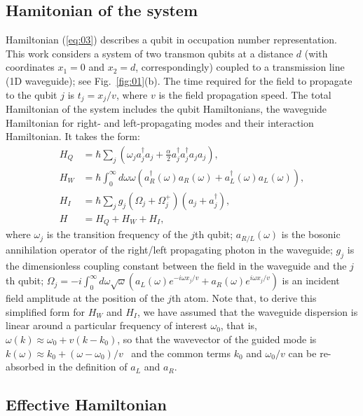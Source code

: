 \documentclass[lettersize,journal]{IEEEtran}
\begin{document}
\subsection{Hamitonian of the system}

Hamiltonian (\ref{eq:03}) describes a qubit in occupation number representation.
This work considers a system of two transmon qubits at a distance $d$ (with coordinates $x_1 = 0$ and $x_2 = d$, correspondingly)  coupled to a transmission line (1D waveguide); see Fig.~\ref{fig:01}(b).
The time required for the field to propagate to the qubit $j$ is $t_j = x_j / v$, where $v$ is the field propagation speed.
The total Hamiltonian of the system includes the qubit Hamiltonians, the waveguide Hamiltonian for right- and left-propagating modes and their interaction Hamiltonian.
It takes the form:
\begin{align} \label{eq:04}
    H_Q &= \hbar \sum_j \left( \omega_j a_j^\dag a_j + \frac{\alpha}{2} a_j^\dag a_j^\dag a_j a_j \right), \\
    H_W &= \hbar \int_0^\infty d \omega \omega \left( a_R^\dag(\omega) a_R(\omega) + a_L^\dag(\omega) a_L(\omega) \right), \\
    H_I &= \hbar \sum_j g_j (\Omega_j + \Omega_j^+) (a_j + a_j^\dag), \\
    H &= H_Q + H_W + H_I,
\end{align}
where $\omega_j$ is the transition frequency of the $j$th qubit; $a_{R/L}(\omega)$ is the bosonic annihilation operator of the right/left propagating photon in the waveguide; $g_j$ is the dimensionless coupling constant between the field in the waveguide and the $j$th qubit; $\Omega_j = - i \int_0^\infty d \omega \sqrt{\omega} \left( a_L(\omega) e^{-i \omega x_j / v} + a_R(\omega) e^{i \omega x_j / v} \right)$ is an incident field amplitude at the position of the $j$th atom.
Note that, to derive this simplified form for $H_W$ and $H_I$, we have assumed that the waveguide dispersion is linear around a particular frequency of interest $\omega_0$, that is, $\omega(k) \approx \omega_0 + v (k - k_0)$, so that the wavevector of the guided mode is $k(\omega) \approx k_0 + (\omega - \omega_0) / v$~\cite{shen_theory_2009} and the common terms $k_0$ and $\omega_0/v$ can be re-absorbed in the definition of $a_L$ and $a_R$.

\subsection{Effective Hamiltonian}
\end{document}
